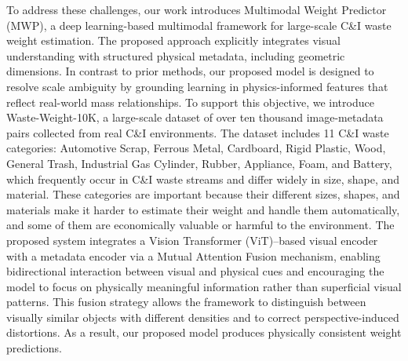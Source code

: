 \documentclass[journal,twoside,web]{ieeecolor}
\begin{document}
To address these challenges, our work introduces Multimodal Weight Predictor (MWP), a deep learning-based multimodal framework for large-scale C\&I waste weight estimation. The proposed approach explicitly integrates visual understanding with structured physical metadata, including geometric dimensions. In contrast to prior methods, our proposed model is designed to resolve scale ambiguity by grounding learning in physics-informed features that reflect real-world mass relationships. To support this objective, we introduce Waste-Weight-10K, a large-scale dataset of over ten thousand image-metadata pairs collected from real C\&I environments. The dataset includes 11 C\&I waste categories: Automotive Scrap, Ferrous Metal, Cardboard, Rigid Plastic, Wood, General Trash, Industrial Gas Cylinder, Rubber, Appliance, Foam, and Battery, which frequently occur in C\&I waste streams and differ widely in size, shape, and material. These categories are important because their different sizes, shapes, and materials make it harder to estimate their weight and handle them automatically, and some of them are economically valuable or harmful to the environment. The proposed system integrates a Vision Transformer (ViT)–based visual encoder with a metadata encoder via a Mutual Attention Fusion mechanism, enabling bidirectional interaction between visual and physical cues and encouraging the model to focus on physically meaningful information rather than superficial visual patterns. This fusion strategy allows the framework to distinguish between visually similar objects with different densities and to correct perspective-induced distortions. As a result, our proposed model produces physically consistent weight predictions.

\end{document}
